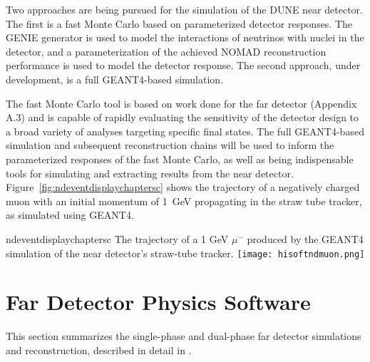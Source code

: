 Two approaches are being  pursued for the simulation of
the DUNE near detector.  The first is a fast Monte Carlo based on
parameterized detector responses. The GENIE\cite{GENIE} generator is
used to model the interactions of neutrinos with nuclei in the
detector, and a parameterization of the achieved NOMAD reconstruction
performance is used to model the detector response.  
The second
approach, under development, is a full GEANT4-based simulation. 
 
 The fast Monte Carlo tool is based on work done for the
far detector\cite{Adams:2013qkq} (Appendix A.3)  and is capable of
rapidly evaluating the sensitivity of the detector design to a broad
variety of analyses targeting specific final states.  The full
GEANT4-based simulation and subsequent reconstruction chains will be
used to inform the parameterized responses of the fast Monte Carlo, as
well as being indispensable tools for simulating and extracting
results from the near detector.
Figure~\ref{fig:ndeventdisplaychaptersc} shows the trajectory of a
negatively charged muon with an initial momentum of 1~GeV propagating
in the straw tube tracker, as simulated using GEANT4.
\begin{cdrfigure}{ndeventdisplaychaptersc}
{The trajectory of a 1 GeV $\mu^-$ produced by the GEANT4 simulation of the near detector's straw-tube tracker.}
\texttt{[image: hisoftndmuon.png]}
\end{cdrfigure}

\section{Far Detector Physics Software}
\label{sec:detectors-sc-physics-software}

This section summarizes %
the single-phase and dual-phase far detector
simulations and reconstruction, described in detail in \anxreco. %

%

